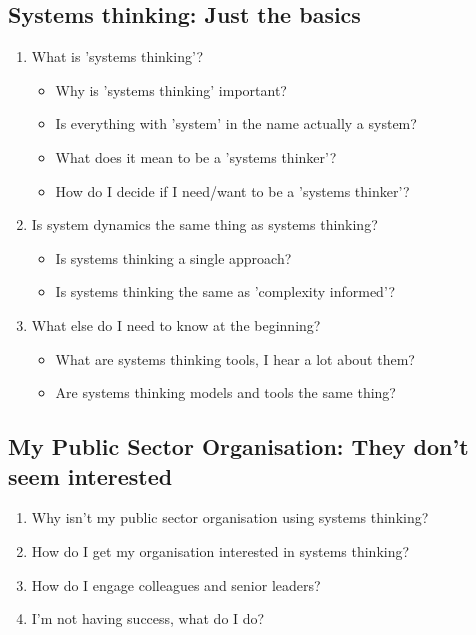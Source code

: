 \subsection*{Systems thinking: Just the basics}
\begin{enumerate}
	\item What is 'systems thinking'?
	\begin{itemize}
		\item Why is 'systems thinking' important?
		\item Is everything with 'system' in the name actually a system?
		\item What does it mean to be a 'systems thinker'?
		\item How do I decide if I need/want to be a 'systems thinker'?
	\end{itemize}
	\item Is system dynamics the same thing as systems thinking?
	\begin{itemize}
	\item Is systems thinking a single approach?
	\item Is systems thinking the same as 'complexity informed'?	 
	\end{itemize}
	\item What else do I need to know at the beginning?
	\begin{itemize}
	\item What are systems thinking tools, I hear a lot about them?
	\item Are systems thinking models and tools the same thing?
	\end{itemize}		
\end{enumerate}

\subsection*{My Public Sector Organisation: They don't seem interested}
\begin{enumerate}
	\item Why isn't my public sector organisation using systems thinking?
	\item How do I get my organisation interested in systems thinking?
	\item How do I engage colleagues and senior leaders?
	\item I'm not having success, what do I do?
\end{enumerate}

